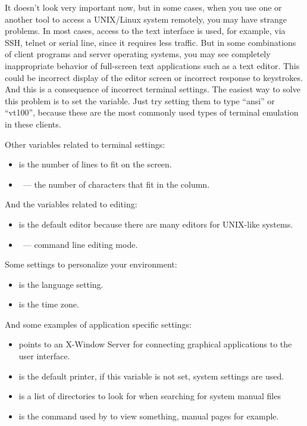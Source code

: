 It doesn't look very important now, but in some cases, when you use one
or another tool to access a UNIX/Linux system remotely, you may have
strange problems. In most cases, access to the text interface is used,
for example, via SSH, telnet or serial line, since it requires less traffic.
But in some combinations of client programs and server operating systems,
you may see completely inappropriate behavior of full-screen text applications
such as a text editor. This could be incorrect display of the editor screen or
incorrect response to keystrokes. And this is a consequence of incorrect
terminal settings. The easiest way to solve this problem is to set
the  variable. Just try setting them to type ``ansi'' or ``vt100'',
because these are the most commonly used types of terminal emulation in these
clients.


Other variables related to terminal settings:
\begin{itemize}
\item {} is the number of lines to fit on the screen.
\item {}~--- the number of characters that fit in the column.
\end{itemize}

And the variables related to editing:
\begin{itemize}
\item {} is the default editor because there are
      many editors for UNIX-like systems.
\item {}~--- command line editing mode.
\end{itemize}

Some settings to personalize your environment:
\begin{itemize}
\item {} is the language setting.
\item {} is the time zone.
\end{itemize}

And some examples of application specific settings:
\begin{itemize}
\item {} points to an X-Window Server for connecting
      graphical applications to the user interface.
\item {} is the default printer, if this variable is not
      set, system settings are used.
\item {} is a list of directories to look for when
      searching for system manual files
\item {} is the command used by  to view something,
      manual pages for example.
\end{itemize}
